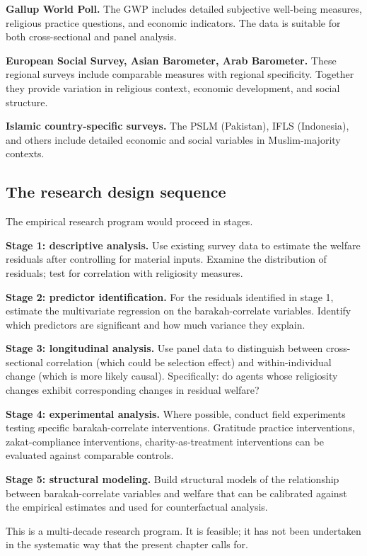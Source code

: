 \textbf{Gallup World Poll.} The GWP includes detailed subjective
well-being measures, religious practice questions, and economic
indicators. The data is suitable for both cross-sectional and
panel analysis.

\textbf{European Social Survey, Asian Barometer, Arab Barometer.}
These regional surveys include comparable measures with regional
specificity. Together they provide variation in religious
context, economic development, and social structure.

\textbf{Islamic country-specific surveys.} The PSLM (Pakistan),
IFLS (Indonesia), and others include detailed economic and
social variables in Muslim-majority contexts.

\subsection{The research design sequence}

The empirical research program would proceed in stages.

\textbf{Stage 1: descriptive analysis.} Use existing survey data
to estimate the welfare residuals after controlling for material
inputs. Examine the distribution of residuals; test for
correlation with religiosity measures.

\textbf{Stage 2: predictor identification.} For the residuals
identified in stage 1, estimate the multivariate regression on
the barakah-correlate variables. Identify which predictors are
significant and how much variance they explain.

\textbf{Stage 3: longitudinal analysis.} Use panel data to
distinguish between cross-sectional correlation (which could be
selection effect) and within-individual change (which is more
likely causal). Specifically: do agents whose religiosity changes
exhibit corresponding changes in residual welfare?

\textbf{Stage 4: experimental analysis.} Where possible, conduct
field experiments testing specific barakah-correlate interventions.
Gratitude practice interventions, zakat-compliance interventions,
charity-as-treatment interventions can be evaluated against
comparable controls.

\textbf{Stage 5: structural modeling.} Build structural models of
the relationship between barakah-correlate variables and welfare
that can be calibrated against the empirical estimates and used
for counterfactual analysis.

This is a multi-decade research program. It is feasible; it has
not been undertaken in the systematic way that the present
chapter calls for.

